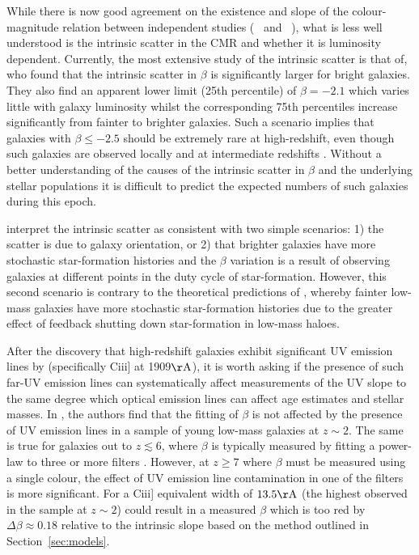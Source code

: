 While there is now good agreement on the existence and slope of the colour-magnitude relation between independent studies (\citeauthor{Bouwens:2013vf}~\citeyear{Bouwens:2013vf} and \citeauthor{Rogers:2014bn}~\citeyear{Rogers:2014bn}), what is less well understood is the intrinsic scatter in the CMR and whether it is luminosity dependent. Currently, the most extensive study of the intrinsic scatter is that of\citet{Rogers:2014bn}, who found that the intrinsic scatter in $\beta$ is significantly larger for bright galaxies. They also find an apparent lower limit (25th percentile) of $\beta = -2.1$ which varies little with galaxy luminosity whilst the corresponding 75th percentiles increase significantly from fainter to brighter galaxies. Such a scenario implies that galaxies with $\beta \leq -2.5$ should be extremely rare at high-redshift, even though such galaxies are observed locally and at intermediate redshifts \citep{Stark:2014fa}. Without a better understanding of the causes of the intrinsic scatter in $\beta$ and the underlying stellar populations it is difficult to predict the expected numbers of such galaxies during this epoch.

\citeauthor{Rogers:2014bn} interpret the intrinsic scatter as consistent with two simple scenarios: 1) the scatter is due to galaxy orientation, or 2) that brighter galaxies have more stochastic star-formation histories and the $\beta$ variation is a result of observing galaxies at different points in the duty cycle of star-formation. However, this second scenario is contrary to the theoretical predictions of \citet{Dayal:2013jm}, whereby fainter low-mass galaxies have more stochastic star-formation histories due to the greater effect of feedback shutting down star-formation in low-mass haloes.
 
After the discovery that high-redshift galaxies exhibit significant UV emission lines by \citet{Stark:2014vc} (specifically {\sc Ciii]} at 1909$\rm{\AA}$), it is worth asking if the presence of such far-UV emission lines can systematically affect measurements of the UV slope to the same degree which optical emission lines can affect age estimates and stellar masses. In \citet{Stark:2014fa}, the authors find that the fitting of $\beta$ is not affected by the presence of UV emission lines in a sample of young low-mass galaxies at $z\sim2$. The same is true for galaxies out to $z \lesssim 6$, where $\beta$ is typically measured by fitting a power-law to three or more filters \citep{Bouwens:2013vf}. However, at $z \geq 7$ where $\beta$ must be measured using a single colour, the effect of UV emission line contamination in one of the filters is more significant. For a {\sc Ciii]} equivalent width of $13.5\rm{\AA}$ (the highest observed in the \citet{Stark:2014fa} sample at $z\sim2$) could result in a measured $\beta$ which is too red by $\Delta\beta \approx 0.18$ relative to the intrinsic slope based on the method outlined in Section~\ref{sec:models}. 

